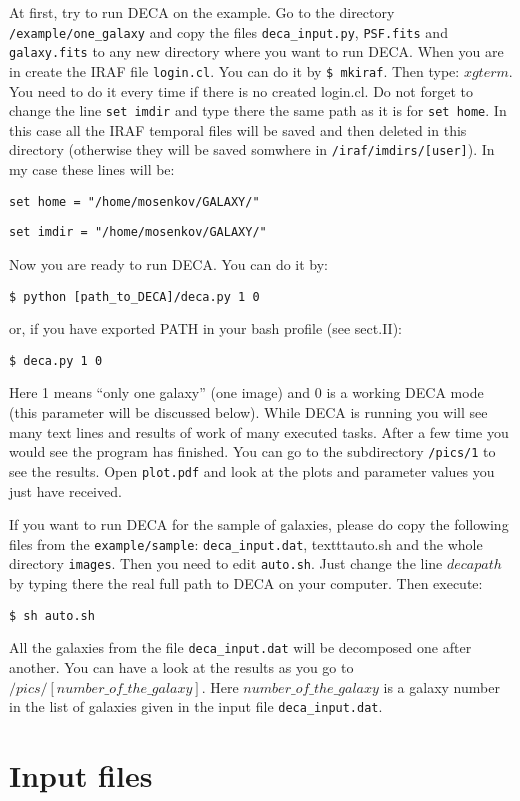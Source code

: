 \documentclass[
aps,%
12pt,%
final,%
notitlepage,%
oneside,%
onecolumn,%
nobibnotes,%
nofootinbib,%
superscriptaddress,%
noshowpacs,%
centertags]%
{revtex4}
\begin{document}
At first, try to run DECA on the example. Go to the directory \texttt{/example/one\_galaxy} and copy the files \texttt{deca\_input.py}, \texttt{PSF.fits} and \texttt{galaxy.fits} to any new directory where you want to run DECA. When you are in create the IRAF file \texttt{login.cl}. You can do it by \texttt{\$ mkiraf}. Then type: $xgterm$. You need to do it every time if there is no created login.cl. Do not forget to change the line \texttt{set imdir} and type there the same path as it is for \texttt{set home}. In this case all the IRAF temporal files will be saved and then deleted in this directory (otherwise they will be saved somwhere in \texttt{/iraf/imdirs/[user]}). In my case these lines will be:

\texttt{set	home		= "/home/mosenkov/GALAXY/"}  

\texttt{set	imdir		= "/home/mosenkov/GALAXY/"} 
	
Now you are ready to run DECA. You can do it by:

	\texttt{\$ python [path\_to\_DECA]/deca.py 1 0}

or, if you have exported PATH in your bash profile (see sect.II):

	\texttt{\$ deca.py 1 0}

Here 1 means ``only one galaxy'' (one image) and 0 is a working DECA mode (this parameter will be discussed below).
While DECA is running you will see many text lines and results of work of many executed tasks. After a few time you would see the program has finished. You can go to the subdirectory \texttt{/pics/1} to see the results. Open \texttt{plot.pdf} and look at the plots and parameter values you just have received.

If you want to run DECA for the sample of galaxies, please do copy the following files from the \texttt{example/sample}: \texttt{deca\_input.dat}, texttt{auto.sh} and the whole directory \texttt{images}. Then you need to edit \texttt{auto.sh}. Just change the line $decapath$ by typing there the real full path to DECA on your computer. Then execute:

	\texttt{\$ sh auto.sh}

All the galaxies from the file \texttt{deca\_input.dat} will be decomposed one after another. You can have a look at the results as you go to $/pics/[number\_of\_the\_galaxy]$. Here $number\_of\_the\_galaxy$ is a galaxy number in the list of galaxies given in the input file \texttt{deca\_input.dat}.   


\section{Input files}
\end{document}
